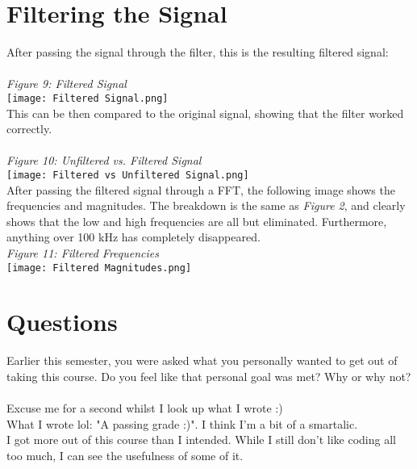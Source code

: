 \documentclass[12pt,a4paper]{article}
\begin{document}
\section{Filtering the Signal}
After passing the signal through the filter, this is the resulting filtered signal:\\
\\
\textit{Figure 9: Filtered Signal}
\\
\texttt{[image: Filtered Signal.png]}
\\
This can be then compared to the original signal, showing that the filter worked correctly.\\
\\
\textit{Figure 10: Unfiltered vs. Filtered Signal}
\\
\texttt{[image: Filtered vs Unfiltered Signal.png]}
\\
After passing the filtered signal through a FFT, the following image shows the frequencies and magnitudes. The breakdown is the same as \textit{Figure 2}, and clearly shows that the low and high frequencies are all but eliminated. Furthermore, anything over 100 kHz has completely disappeared.\\
\newpage
\textit{Figure 11: Filtered Frequencies}
\\
\texttt{[image: Filtered Magnitudes.png]}
\newpage
\section{Questions}
Earlier this semester, you were asked what you personally wanted to get out of taking this course. Do you feel like that personal goal was met? Why or why not?\\
\\
Excuse me for a second whilst I look up what I wrote :)\\
What I wrote lol: "A passing grade :)". I think I'm a bit of a smartalic.\\
I got more out of this course than I intended. While I still don't like coding all too much, I can see the usefulness of some of it.
\newpage
\end{document}
